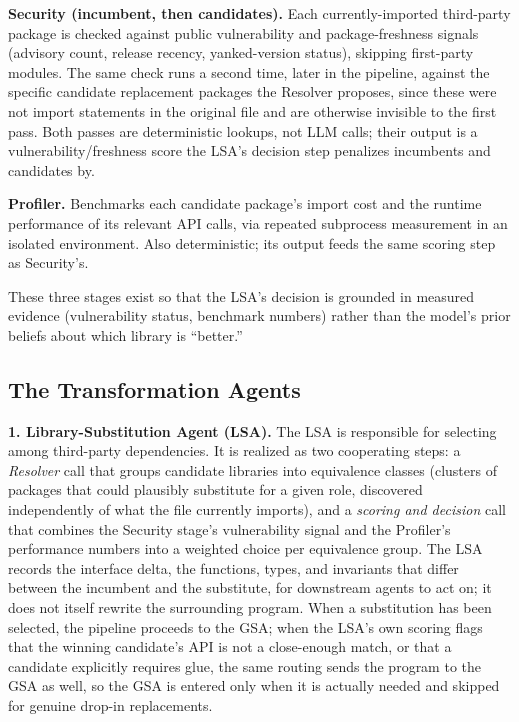 \textbf{Security (incumbent, then candidates).} Each currently-imported third-party package is checked against public vulnerability and package-freshness signals (advisory count, release recency, yanked-version status), skipping first-party modules. The same check runs a second time, later in the pipeline, against the specific candidate replacement packages the Resolver proposes, since these were not import statements in the original file and are otherwise invisible to the first pass. Both passes are deterministic lookups, not LLM calls; their output is a vulnerability/freshness score the LSA's decision step penalizes incumbents and candidates by.

\textbf{Profiler.} Benchmarks each candidate package's import cost and the runtime performance of its relevant API calls, via repeated subprocess measurement in an isolated environment. Also deterministic; its output feeds the same scoring step as Security's.

These three stages exist so that the LSA's decision is grounded in measured evidence (vulnerability status, benchmark numbers) rather than the model's prior beliefs about which library is ``better.''

\subsection{The Transformation Agents}

\textbf{1. Library-Substitution Agent (LSA).} The LSA is responsible for selecting among third-party dependencies. It is realized as two cooperating steps: a \emph{Resolver} call that groups candidate libraries into equivalence classes (clusters of packages that could plausibly substitute for a given role, discovered independently of what the file currently imports), and a \emph{scoring and decision} call that combines the Security stage's vulnerability signal and the Profiler's performance numbers into a weighted choice per equivalence group. The LSA records the interface delta, the functions, types, and invariants that differ between the incumbent and the substitute, for downstream agents to act on; it does not itself rewrite the surrounding program. When a substitution has been selected, the pipeline proceeds to the GSA; when the LSA's own scoring flags that the winning candidate's API is not a close-enough match, or that a candidate explicitly requires glue, the same routing sends the program to the GSA as well, so the GSA is entered only when it is actually needed and skipped for genuine drop-in replacements.

